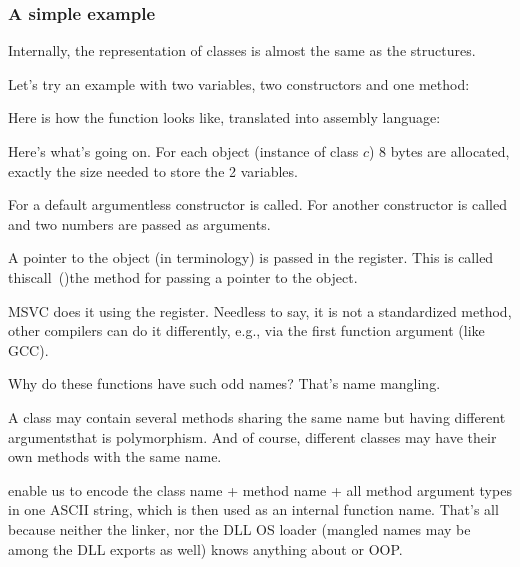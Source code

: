 \subsubsection{A simple example}

Internally, the representation of \Cpp classes is almost the same as the structures.

Let's try an example with two variables, two constructors and one method:




Here is how the \main function looks like, translated 
into assembly language:



Here's what's going on.
For each object (instance of class $c$) 8 bytes are allocated,
exactly the size needed to store the 2 variables.

For  a default argumentless constructor  is called.
For  another constructor  is called and two numbers are passed as arguments.

\label{thiscall}

A pointer to the object (\ITthis in \Cpp terminology) is passed in the \ECX register.
This is called thiscall~()\EMDASH{}the method for passing a pointer to the object.

MSVC does it using the \ECX register. Needless to say, it is not a standardized method, other compilers can do it
differently, e.g., via the first function argument (like GCC).

\label{namemangling}

Why do these functions have such odd names?
That's \gls{name mangling}.

A \Cpp class may contain several methods sharing the same name but having different 
arguments\EMDASH{}that is polymorphism.
And of course, different classes may have their own methods with the same name.


 enable us to encode the class name + method name + all method argument types
in one ASCII string, which is then used as an internal function name.
That's all because neither the linker, nor the DLL \ac{OS} loader (mangled names may be among 
the DLL exports as well) knows anything about \Cpp or \ac{OOP}.


